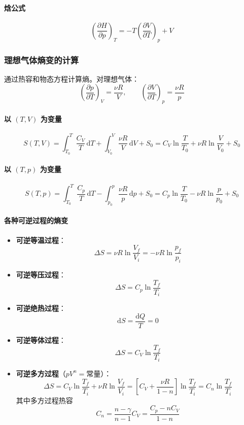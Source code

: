 \documentclass[UTF8]{ctexart}
\begin{document}
\paragraph{焓公式}
\[
\left(\frac{\partial H}{\partial p}\right)_T=-T\left(\frac{\partial V}{\partial T}\right)_p+V
\]

\subsubsection{理想气体熵变的计算}

通过热容和物态方程计算熵。对理想气体：
\[
\left(\frac{\partial p}{\partial T}\right)_V=\frac{\nu R}{V},\qquad
\left(\frac{\partial V}{\partial T}\right)_p=\frac{\nu R}{p}
\]

\paragraph{以 $(T,V)$ 为变量}
\[
S(T,V)=\int_{T_0}^T\frac{C_V}{T}\,\mathrm{d}T+\int_{V_0}^V\frac{\nu R}{V}\,\mathrm{d}V+S_0
=C_V\ln\frac{T}{T_0}+\nu R\ln\frac{V}{V_0}+S_0
\]

\paragraph{以 $(T,p)$ 为变量}
\[
S(T,p)=\int_{T_0}^T\frac{C_p}{T}\,\mathrm{d}T-\int_{p_0}^p\frac{\nu R}{p}\,\mathrm{d}p+S_0
=C_p\ln\frac{T}{T_0}-\nu R\ln\frac{p}{p_0}+S_0
\]

\paragraph{各种可逆过程的熵变}

\begin{itemize}[leftmargin=2em]
  \item \textbf{可逆等温过程}：
  \[
  \Delta S=\nu R\ln\frac{V_f}{V_i}=-\nu R\ln\frac{p_f}{p_i}
  \]
  \item \textbf{可逆等压过程}：
  \[
  \Delta S=C_p\ln\frac{T_f}{T_i}
  \]
  \item \textbf{可逆绝热过程}：
  \[
  \mathrm{d}S=\frac{\mathrm{d}Q}{T}=0
  \]
  \item \textbf{可逆等体过程}：
  \[
  \Delta S=C_V\ln\frac{T_f}{T_i}
  \]
  \item \textbf{可逆多方过程}（$pV^n=\text{常量}$）：
  \[
  \Delta S=C_V\ln\frac{T_f}{T_i}+\nu R\ln\frac{V_f}{V_i}
  =\left[C_V+\frac{\nu R}{1-n}\right]\ln\frac{T_f}{T_i}
  =C_n\ln\frac{T_f}{T_i}
  \]
  其中多方过程热容
  \[
  C_n=\frac{n-\gamma}{n-1}C_V=\frac{C_p-nC_V}{1-n}
  \]
\end{itemize}
\end{document}
